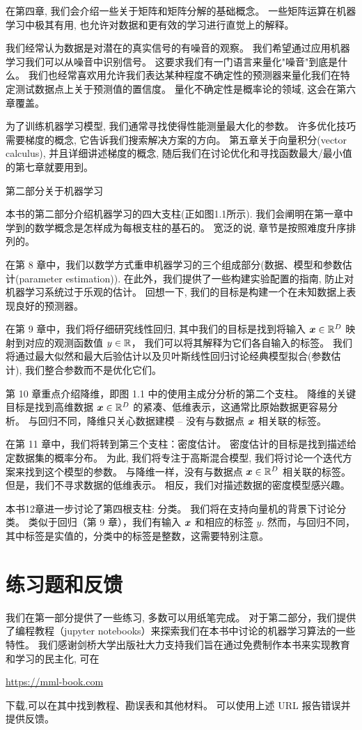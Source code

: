 在第四章, 我们会介绍一些关于矩阵和矩阵分解的基础概念。
一些矩阵运算在机器学习中极其有用, 也允许对数据和更有效的学习进行直觉上的解释。

我们经常认为数据是对潜在的真实信号的有噪音的观察。
我们希望通过应用机器学习我们可以从噪音中识别信号。
这要求我们有一门语言来量化"噪音"到底是什么。
我们也经常喜欢用允许我们表达某种程度不确定性的预测器来量化我们在特定测试数据点上关于预测值的置信度。
量化不确定性是概率论的领域, 这会在第六章覆盖。

为了训练机器学习模型, 我们通常寻找使得性能测量最大化的参数。
许多优化技巧需要梯度的概念, 它告诉我们搜索解决方案的方向。
第五章关于向量积分(vector calculus), 并且详细讲述梯度的概念, 随后我们在讨论优化和寻找函数最大/最小值的第七章就要用到。

\begin{center}
	第二部分关于机器学习
\end{center}
本书的第二部分介绍机器学习的四大支柱(正如图1.1所示).
我们会阐明在第一章中学到的数学概念是怎样成为每根支柱的基石的。
宽泛的说, 章节是按照难度升序排列的。

在第 8 章中，我们以数学方式重申机器学习的三个组成部分(数据、模型和参数估计(parameter estimation)).
在此外，我们提供了一些构建实验配置的指南, 防止对机器学习系统过于乐观的估计。
回想一下, 我们的目标是构建一个在未知数据上表现良好的预测器。

在第 9 章中，我们将仔细研究线性回归,
其中我们的目标是找到将输入 $\boldsymbol{x} \in \mathbb{R}^D$ 映射到对应的观测函数值 $y \in \mathbb{R}$，
我们可以将其解释为它们各自输入的标签。
我们将通过最大似然和最大后验估计以及贝叶斯线性回归讨论经典模型拟合(参数估计), 我们整合参数而不是优化它们。

第 10 章重点介绍降维，即图 1.1 中的使用主成分分析的第二个支柱。
降维的关键目标是找到高维数据 $\boldsymbol{x} \in \mathbb{R}^D$ 的紧凑、低维表示，这通常比原始数据更容易分析。
与回归不同，降维只关心数据建模 -- 没有与数据点 $\boldsymbol{x}$ 相关联的标签。

在第 11 章中，我们将转到第三个支柱：密度估计。
密度估计的目标是找到描述给定数据集的概率分布。
为此, 我们将专注于高斯混合模型, 我们将讨论一个迭代方案来找到这个模型的参数。
与降维一样，没有与数据点 $\boldsymbol{x} \in \mathbb{R}^D$ 相关联的标签。
但是，我们不寻求数据的低维表示。
相反，我们对描述数据的密度模型感兴趣。

本书12章进一步讨论了第四根支柱: 分类。
我们将在支持向量机的背景下讨论分类。
类似于回归（第 9 章），我们有输入 $\boldsymbol{x}$ 和相应的标签 $y$.
然而，与回归不同，其中标签是实值的，分类中的标签是整数，这需要特别注意。

\section{练习题和反馈}

我们在第一部分提供了一些练习, 多数可以用纸笔完成。
对于第二部分，我们提供了编程教程（jupyter notebooks）来探索我们在本书中讨论的机器学习算法的一些特性。
我们感谢剑桥大学出版社大力支持我们旨在通过免费制作本书来实现教育和学习的民主化, 可在
\begin{center}
	\url{https://mml-book.com}
\end{center}
下载,可以在其中找到教程、勘误表和其他材料。
可以使用上述 URL 报告错误并提供反馈。
